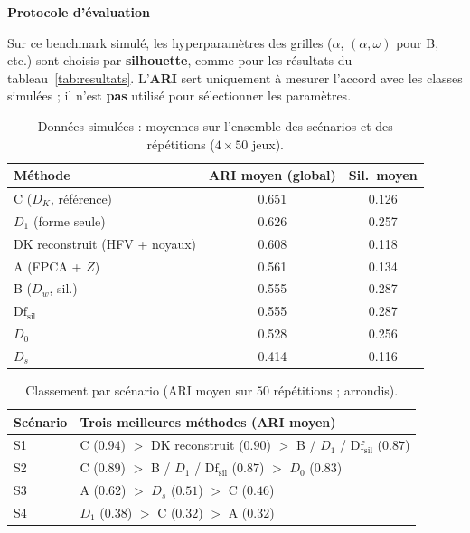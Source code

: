 \documentclass[11pt, a4paper]{article}
\newcommand{\Dw}{D_w}
\newcommand{\DK}{D_K}
\newenvironment{keybox}[1][]{%
  \def\FrameCommand{\fboxsep=8pt \fcolorbox{emphborder}{emphbox}}%
  \MakeFramed{\advance\hsize-\width \FrameRestore}%
  \noindent\textbf{#1}\par\smallskip\noindent\ignorespaces
}{\endMakeFramed}
\begin{document}
\begin{keybox}[Protocole d'évaluation]
Sur ce benchmark simulé, les hyperparamètres des grilles ($\alpha$,
$(\alpha,\omega)$ pour B, etc.) sont choisis par \textbf{silhouette},
comme pour les résultats du tableau~\ref{tab:resultats}. L'\textbf{ARI}
sert uniquement à mesurer l'accord avec les classes simulées ; il n'est
\textbf{pas} utilisé pour sélectionner les paramètres.
\end{keybox}

\begin{table}[H]
\centering
\renewcommand{\arraystretch}{1.25}
\begin{tabular}{lcc}
  \toprule
  \textbf{Méthode} & \textbf{ARI moyen (global)} & \textbf{Sil.\ moyen} \\
  \midrule
  C ($\DK$, référence) & 0.651 & 0.126 \\
  $D_1$ (forme seule)               & 0.626 & 0.257 \\
  DK reconstruit (HFV + noyaux)    & 0.608 & 0.118 \\
  A (FPCA + $Z$)                   & 0.561 & 0.134 \\
  B ($\Dw$, sil.)                  & 0.555 & 0.287 \\
  $\mathrm{Df}_{\mathrm{sil}}$     & 0.555 & 0.287 \\
  $D_0$                            & 0.528 & 0.256 \\
  $D_s$                            & 0.414 & 0.116 \\
  \bottomrule
\end{tabular}
\caption{Données simulées : moyennes sur l'ensemble des scénarios et des
répétitions ($4 \times 50$ jeux).}
\label{tab:sim_global}
\end{table}

\begin{table}[H]
\centering
\renewcommand{\arraystretch}{1.2}
\small
\begin{tabular}{lp{7.2cm}}
  \toprule
  \textbf{Scénario} & \textbf{Trois meilleures méthodes (ARI moyen)} \\
  \midrule
  S1 & C ($0.94$) $>$ DK reconstruit ($0.90$) $>$ B / $D_1$ / $\mathrm{Df}_{\mathrm{sil}}$ ($0.87$) \\
  S2 & C ($0.89$) $>$ B / $D_1$ / $\mathrm{Df}_{\mathrm{sil}}$ ($0.87$) $>$ $D_0$ ($0.83$) \\
  S3 & A ($0.62$) $>$ $D_s$ ($0.51$) $>$ C ($0.46$) \\
  S4 & $D_1$ ($0.38$) $>$ C ($0.32$) $>$ A ($0.32$) \\
  \bottomrule
\end{tabular}
\caption{Classement par scénario (ARI moyen sur $50$ répétitions ; arrondis).}
\label{tab:sim_ranking}
\end{table}
\end{document}
